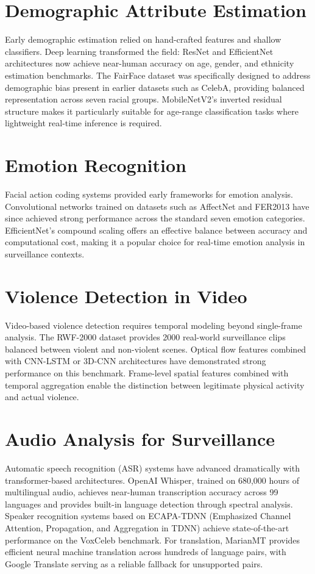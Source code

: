 \documentclass[12pt]{report}
\begin{document}
\section{Demographic Attribute Estimation}
Early demographic estimation relied on hand-crafted features and shallow classifiers. Deep learning transformed the field: ResNet and EfficientNet architectures now achieve near-human accuracy on age, gender, and ethnicity estimation benchmarks. The FairFace dataset was specifically designed to address demographic bias present in earlier datasets such as CelebA, providing balanced representation across seven racial groups. MobileNetV2's inverted residual structure makes it particularly suitable for age-range classification tasks where lightweight real-time inference is required.

\section{Emotion Recognition}
Facial action coding systems provided early frameworks for emotion analysis. Convolutional networks trained on datasets such as AffectNet and FER2013 have since achieved strong performance across the standard seven emotion categories. EfficientNet's compound scaling offers an effective balance between accuracy and computational cost, making it a popular choice for real-time emotion analysis in surveillance contexts.

\section{Violence Detection in Video}
Video-based violence detection requires temporal modeling beyond single-frame analysis. The RWF-2000 dataset provides 2000 real-world surveillance clips balanced between violent and non-violent scenes. Optical flow features combined with CNN-LSTM or 3D-CNN architectures have demonstrated strong performance on this benchmark. Frame-level spatial features combined with temporal aggregation enable the distinction between legitimate physical activity and actual violence.

\section{Audio Analysis for Surveillance}
Automatic speech recognition (ASR) systems have advanced dramatically with transformer-based architectures. OpenAI Whisper, trained on 680,000 hours of multilingual audio, achieves near-human transcription accuracy across 99 languages and provides built-in language detection through spectral analysis. Speaker recognition systems based on ECAPA-TDNN (Emphasized Channel Attention, Propagation, and Aggregation in TDNN) achieve state-of-the-art performance on the VoxCeleb benchmark. For translation, MarianMT provides efficient neural machine translation across hundreds of language pairs, with Google Translate serving as a reliable fallback for unsupported pairs.
\end{document}
